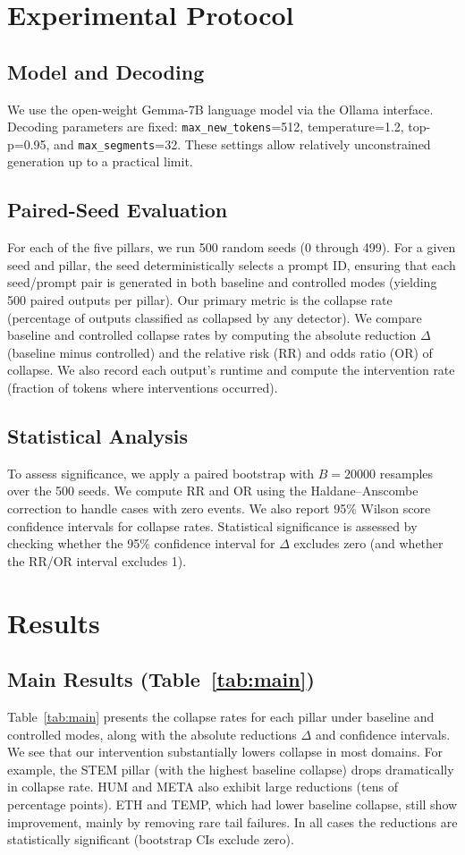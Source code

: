 \documentclass{article}
\begin{document}
\section{Experimental Protocol}
\subsection{Model and Decoding}
We use the open-weight Gemma-7B language model via the Ollama interface. Decoding parameters are fixed: \texttt{max\_new\_tokens}=512, temperature=1.2, top-p=0.95, and \texttt{max\_segments}=32. These settings allow relatively unconstrained generation up to a practical limit.

\subsection{Paired-Seed Evaluation}
For each of the five pillars, we run 500 random seeds (0 through 499). For a given seed and pillar, the seed deterministically selects a prompt ID, ensuring that each seed/prompt pair is generated in both baseline and controlled modes (yielding 500 paired outputs per pillar). Our primary metric is the collapse rate (percentage of outputs classified as collapsed by any detector). We compare baseline and controlled collapse rates by computing the absolute reduction $\Delta$ (baseline minus controlled) and the relative risk (RR) and odds ratio (OR) of collapse. We also record each output's runtime and compute the intervention rate (fraction of tokens where interventions occurred).

\subsection{Statistical Analysis}
To assess significance, we apply a paired bootstrap with $B=20000$ resamples over the 500 seeds. We compute RR and OR using the Haldane--Anscombe correction to handle cases with zero events. We also report 95\% Wilson score confidence intervals for collapse rates. Statistical significance is assessed by checking whether the 95\% confidence interval for $\Delta$ excludes zero (and whether the RR/OR interval excludes 1).

\section{Results}
\subsection{Main Results (Table~\ref{tab:main})}
Table~\ref{tab:main} presents the collapse rates for each pillar under baseline and controlled modes, along with the absolute reductions $\Delta$ and confidence intervals. We see that our intervention substantially lowers collapse in most domains. For example, the STEM pillar (with the highest baseline collapse) drops dramatically in collapse rate. HUM and META also exhibit large reductions (tens of percentage points). ETH and TEMP, which had lower baseline collapse, still show improvement, mainly by removing rare tail failures. In all cases the reductions are statistically significant (bootstrap CIs exclude zero).
\end{document}
